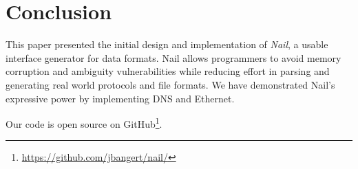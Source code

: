 \section{Conclusion}
\label{s:concl}
This paper presented the initial design and implementation of \textit{Nail}, a usable interface
generator for data formats. Nail allows programmers to avoid memory corruption and ambiguity
vulnerabilities while reducing effort in parsing and generating real world protocols and file
formats. We have demonstrated Nail's expressive power by implementing DNS and Ethernet. 

Our code is open source on GitHub\footnote{\url{https://github.com/jbangert/nail/}}.


